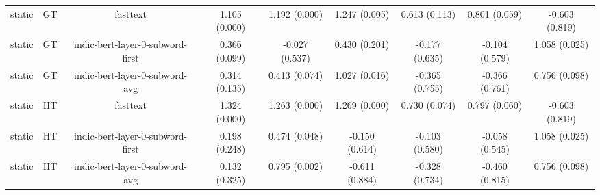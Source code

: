 \begin{sidewaystable}[htb]
\begin{tabular}{@{}ccccccccc@{}}
        static & GT & fasttext & 1.105 (0.000) & 1.192 (0.000) & 1.247 (0.005) & 0.613 (0.113) & 0.801 (0.059) & -0.603 (0.819) \\
        static & GT & indic-bert-layer-0-subword-first & 0.366 (0.099) & -0.027 (0.537) & 0.430 (0.201) & -0.177 (0.635) & -0.104 (0.579) & 1.058 (0.025) \\
        static & GT & indic-bert-layer-0-subword-avg & 0.314 (0.135) & 0.413 (0.074) & 1.027 (0.016) & -0.365 (0.755) & -0.366 (0.761) & 0.756 (0.098) \\
        static & HT & fasttext & 1.324 (0.000) & 1.263 (0.000) & 1.269 (0.000) & 0.730 (0.074) & 0.797 (0.060) & -0.603 (0.819) \\
        static & HT & indic-bert-layer-0-subword-first & 0.198 (0.248) & 0.474 (0.048) & -0.150 (0.614) & -0.103 (0.580) & -0.058 (0.545) & 1.058 (0.025) \\
        static & HT & indic-bert-layer-0-subword-avg & 0.132 (0.325) & 0.795 (0.002) & -0.611 (0.884) & -0.328 (0.734) & -0.460 (0.815) & 0.756 (0.098) \\
        \bottomrule
    \end{tabular}
\end{sidewaystable}